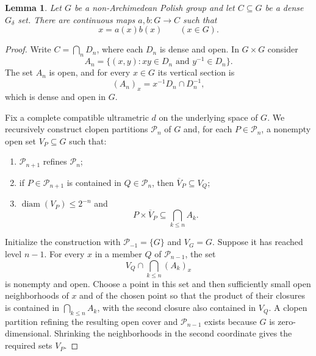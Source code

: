 \documentclass[12pt]{amsart}
\newtheorem{lemma}[theorem]{Lemma}
\theoremstyle{definition}
\newcommand{\func}[1]{\operatorname{#1}}
\begin{document}
\begin{lemma}
\label{lem:two-factor} Let $G$ be a non-Archimedean Polish group and let $%
C\subseteq G$ be a dense $G_{\delta }$ set. There are continuous maps $%
a,b:G\rightarrow C$ such that 
\begin{equation*}
x=a(x)b(x)\qquad (x\in G).
\end{equation*}
\end{lemma}

\begin{proof}
Write $C=\bigcap_{n}D_{n}$, where each $D_{n}$ is dense and open. In $%
G\times G$ consider 
\begin{equation*}
A_{n}=\{(x,y):xy\in D_{n}\text{ and }y^{-1}\in D_{n}\}.
\end{equation*}%
The set $A_{n}$ is open, and for every $x\in G$ its vertical section is 
\begin{equation*}
(A_{n})_{x}=x^{-1}D_{n}\cap D_{n}^{-1},
\end{equation*}%
which is dense and open in $G$.

Fix a complete compatible ultrametric $d$ on the underlying space of $G$. We
recursively construct clopen partitions $\mathcal{P}_n$ of $G$ and, for each 
$P\in\mathcal{P}_n$, a nonempty open set $V_P\subseteq G$ such that:

\begin{enumerate}
\item $\mathcal{P}_{n+1}$ refines $\mathcal{P}_n$;

\item if $P\in \mathcal{P}_{n+1}$ is contained in $Q\in \mathcal{P}_{n}$,
then $\overline{V}_{P}\subseteq V_{Q}$;

\item $\func{diam}(V_{P})\leq 2^{-n}$ and 
\begin{equation*}
P\times \overline{V}_{P}\subseteq \bigcap_{k\leq n}A_{k}.
\end{equation*}
\end{enumerate}

Initialize the construction with $\mathcal{P}_{-1}=\{G\}$ and $V_G=G$.
Suppose it has reached level $n-1$. For every $x$ in a member $Q$ of $%
\mathcal{P}_{n-1}$, the set 
\begin{equation*}
V_Q\cap\bigcap_{k\leq n}(A_k)_x
\end{equation*}
is nonempty and open. Choose a point in this set and then sufficiently small
open neighborhoods of $x$ and of the chosen point so that the product of
their closures is contained in $\bigcap_{k\leq n}A_k$, with the second
closure also contained in $V_Q$. A clopen partition refining the resulting
open cover and $\mathcal{P}_{n-1}$ exists because $G$ is zero-dimensional.
Shrinking the neighborhoods in the second coordinate gives the required sets 
$V_P$.


\end{proof}
\end{document}
